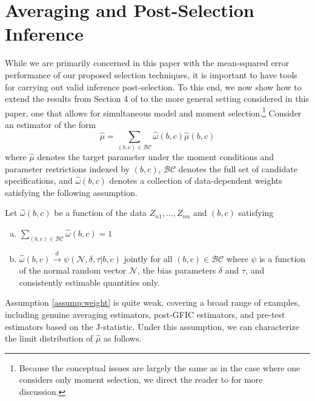 \section{Averaging and Post-Selection Inference}
\label{sec:avg}
While we are primarily concerned in this paper with the mean-squared error performance of our proposed selection techniques, it is important to have tools for carrying out valid inference post-selection.
To this end, we now show how to extend the results from Section 4 of \cite{DiTraglia2012} to the more general setting considered in this paper, one that allows for simultaneous model and moment selection.\footnote{Because the conceptual issues are largely the same as in the case where one considers only moment selection, we direct the reader to \cite{DiTraglia2012} for more discussion.}
Consider an estimator of the form 
	$$\widehat{\mu} = \sum_{(b,c) \in \mathcal{BC}} \widehat{\omega}(b,c) \widehat{\mu}(b,c)$$
  where $\widehat{\mu}$ denotes the target parameter under the moment conditions and parameter restrictions indexed by $(b,c)$, $\mathcal{BC}$ denotes the full set of candidate specifications, and $\widehat{\omega}(b,c)$ denotes a collection of data-dependent weights satisfying the following assumption.
\begin{assump} Let $\widehat{\omega}(b,c)$ be a function of the data $Z_{n1}, \hdots, Z_{nn}$ and $(b,c)$ satisfying
	\begin{enumerate}[(a)] 
		\item $\sum_{(b,c) \in \mathcal{BC}} \widehat{\omega}(b,c) = 1$
		\item $\widehat{\omega}(b,c) \overset{d}{\rightarrow} \psi(\mathscr{N}, \delta, \tau|b,c)$ jointly for all $(b,c) \in \mathcal{BC}$ where $\psi$ is a function of the normal random vector $\mathscr{N}$, the bias parameters $\delta$ and $\tau$, and consistently estimable quantities only.
	\end{enumerate}
\label{assump:weight}
\end{assump}

Assumption \ref{assump:weight} is quite weak, covering a broad range of examples, including genuine averaging estimators, post-GFIC estimators, and pre-test estimators based on the J-statistic.
Under this assumption, we can characterize the limit distribution of $\widehat{\mu}$ as follows.

